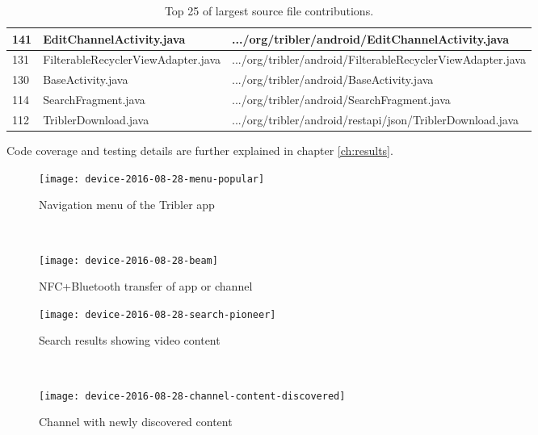 \begin{table}
\begin{tabular}{l | l | l}
		141 &		EditChannelActivity.java &		.../org/tribler/android/EditChannelActivity.java \\ \hline
		131 &		FilterableRecyclerViewAdapter.java &		.../org/tribler/android/FilterableRecyclerViewAdapter.java \\ \hline
		130 & 		BaseActivity.java &		.../org/tribler/android/BaseActivity.java \\ \hline
		114 &		SearchFragment.java &		.../org/tribler/android/SearchFragment.java \\ \hline
		112 & 		TriblerDownload.java &		.../org/tribler/android/restapi/json/TriblerDownload.java \\ \hline
	\end{tabular}
	\caption{Top 25 of largest source file contributions.}
	\label{table:loc}
\end{table}

Code coverage and testing details are further explained in chapter \ref{ch:results}.




\begin{figure}[H]
	\centering
\begin{minipage}{.4\textwidth}
	\texttt{[image: device-2016-08-28-menu-popular]}
	\caption{Navigation menu of the Tribler app}
	\label{fig:menu-popular}
\end{minipage}
~
\begin{minipage}{.4\textwidth}
	\texttt{[image: device-2016-08-28-beam]}
	\caption{NFC+Bluetooth transfer of app or channel}
	\label{fig:beam}
\end{minipage}

\begin{minipage}{.4\textwidth}
	\texttt{[image: device-2016-08-28-search-pioneer]}
	\caption{Search results showing video content}
	\label{fig:search-pioneer}
\end{minipage}
~
\begin{minipage}{.4\textwidth}
	\texttt{[image: device-2016-08-28-channel-content-discovered]}
	\caption{Channel with newly discovered content}
	\label{fig:channel-content-discovered}
\end{minipage}
\end{figure}